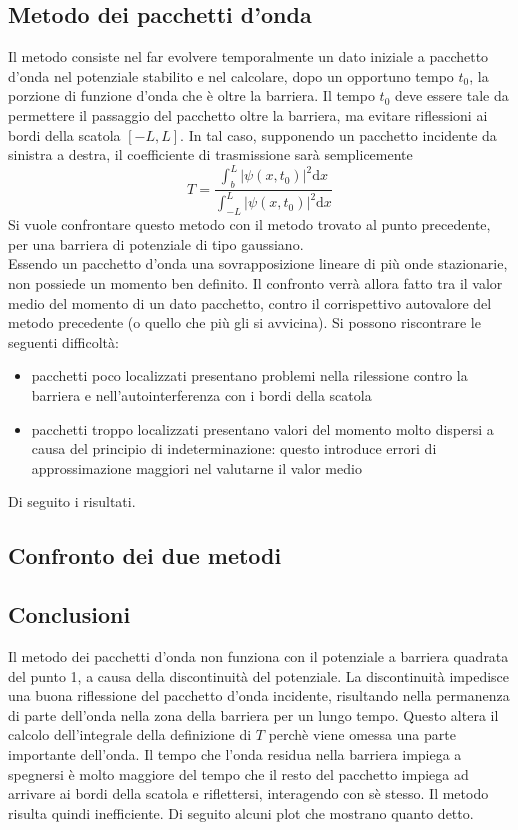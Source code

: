 \subsection*{Metodo dei pacchetti d'onda}
Il metodo consiste nel far evolvere temporalmente un dato iniziale a pacchetto
d'onda nel potenziale stabilito e nel calcolare, dopo un opportuno tempo $t_0$,
la porzione di funzione d'onda che è oltre la barriera. Il tempo $t_0$ deve essere tale
da permettere il passaggio del pacchetto oltre la barriera, ma evitare riflessioni
ai bordi della scatola $[-L,L]$.
In tal caso, supponendo un pacchetto incidente da sinistra a destra,
il coefficiente di trasmissione sarà semplicemente
    $$ T = \frac{\int_b^L |\psi(x,t_0)|^2\mathrm d x}{\int_{-L}^L |\psi(x,t_0)|^2\mathrm d x} $$
Si vuole confrontare questo metodo con il metodo trovato al punto precedente,
per una barriera di potenziale di tipo gaussiano.\\
Essendo un pacchetto d'onda una sovrapposizione lineare di più onde stazionarie,
non possiede un momento ben definito. Il confronto verrà allora fatto tra il valor medio
del momento di un dato pacchetto, contro il corrispettivo autovalore
del metodo precedente (o quello che più gli si avvicina).
Si possono riscontrare le seguenti difficoltà:
\begin{itemize}
    \item pacchetti poco localizzati presentano problemi nella rilessione contro la barriera
    e nell'autointerferenza con i bordi della scatola
    \item pacchetti troppo localizzati presentano valori del momento
    molto dispersi a causa del principio di indeterminazione:
    questo introduce errori di approssimazione maggiori nel valutarne il valor medio
\end{itemize}
\bigskip
Di seguito i risultati.
\\

\subsection*{Confronto dei due metodi}

\newpage
\subsection*{Conclusioni}
Il metodo dei pacchetti d'onda non funziona con il potenziale a barriera quadrata
del punto 1, a causa della discontinuità del potenziale. La discontinuità
impedisce una buona riflessione del pacchetto d'onda incidente, risultando nella
permanenza di parte dell'onda nella zona della barriera per un lungo tempo.
Questo altera il calcolo dell'integrale della definizione di $T$ perchè
viene omessa una parte importante dell'onda. Il tempo che l'onda residua nella barriera
impiega a spegnersi è molto maggiore del tempo che il resto del pacchetto impiega
ad arrivare ai bordi della scatola e riflettersi, interagendo con sè stesso.
Il metodo risulta quindi inefficiente. Di seguito alcuni plot che mostrano
quanto detto.

